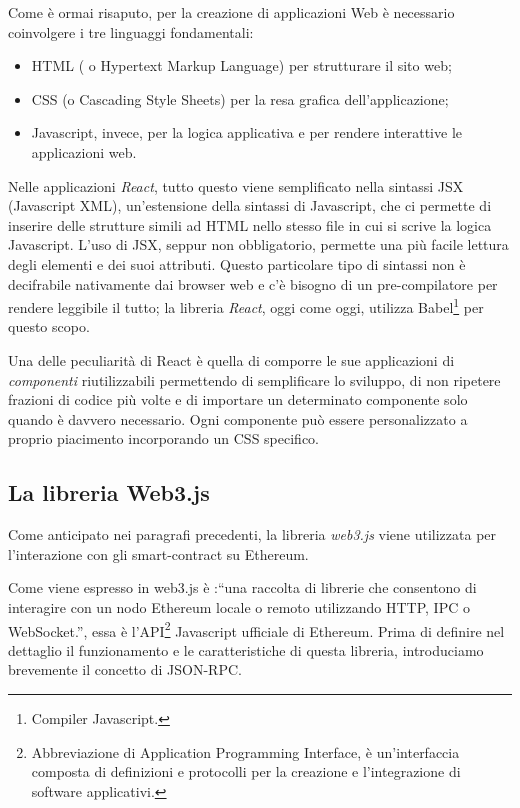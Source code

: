 Come è ormai risaputo, per la creazione di applicazioni Web è necessario coinvolgere i tre linguaggi fondamentali:
\begin{itemize}
\item HTML ( o Hypertext Markup Language) per strutturare il sito web;
\item CSS (o Cascading Style Sheets) per la resa grafica dell'applicazione;
\item Javascript, invece, per la logica applicativa e per rendere interattive le applicazioni web.
\end{itemize}

Nelle applicazioni \textit{React}, tutto questo viene semplificato nella sintassi JSX (Javascript XML), un'estensione della sintassi di Javascript, che ci permette di inserire delle strutture simili ad HTML nello stesso file in cui si scrive la logica Javascript. L'uso di JSX, seppur non obbligatorio, permette una più facile lettura degli elementi e dei suoi attributi. Questo particolare tipo di sintassi non è decifrabile nativamente dai browser web e c'è bisogno di un pre-compilatore per rendere leggibile il tutto; la libreria \textit{React}, oggi come oggi, utilizza Babel\footnote{Compiler Javascript.} per questo scopo.

Una delle peculiarità di React è quella di comporre le sue applicazioni di \textit{componenti} riutilizzabili permettendo di semplificare lo sviluppo, di non ripetere frazioni di codice più volte e di importare un determinato componente solo quando è davvero necessario.
Ogni componente può essere personalizzato a proprio piacimento incorporando un CSS specifico.

\subsection{La libreria Web3.js}\label{web3_Library}
Come anticipato nei paragrafi precedenti, la libreria \textit{web3.js}\cite{web3API} viene utilizzata per l'interazione con gli smart-contract su Ethereum.

Come viene espresso in \cite{web3API} web3.js è :“una raccolta di librerie che consentono di interagire con un nodo Ethereum locale o remoto utilizzando HTTP, IPC o WebSocket.”, essa è l'API\footnote{Abbreviazione di Application Programming Interface, è un'interfaccia composta di definizioni e protocolli per la creazione e l'integrazione di software applicativi.} Javascript ufficiale di Ethereum.
Prima di definire nel dettaglio il funzionamento e le caratteristiche di questa libreria, introduciamo brevemente il concetto di JSON-RPC.

